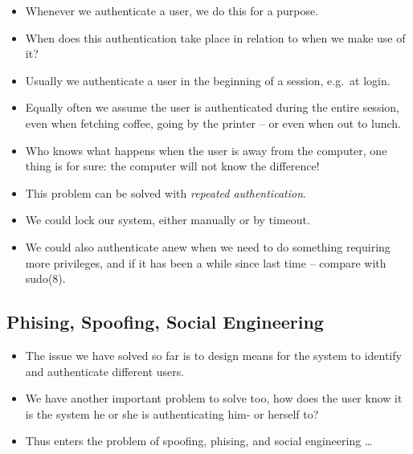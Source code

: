 \documentclass{beamer}
\begin{document}
\begin{frame}{\insertsubsectionhead}
  \begin{itemize}
    \item Whenever we authenticate a user, we do this for a purpose.

    \item When does this authentication take place in relation to when we make 
      use of it?

    \item Usually we authenticate a user in the beginning of a session, e.g.\ 
      at login.

    \item Equally often we assume the user is authenticated during the entire 
      session, even when fetching coffee, going by the printer -- or even when 
      out to lunch.

    \item Who knows what happens when the user is away from the computer, one 
      thing is for sure: the computer will not know the difference!

  \end{itemize}
\end{frame}

\begin{frame}{\insertsubsectionhead}
  \begin{itemize}
    \item This problem can be solved with \emph{repeated authentication}.

    \item We could lock our system, either manually or by timeout.

    \item We could also authenticate anew when we need to do something 
      requiring more privileges, and if it has been a while since last time -- 
      compare with sudo(8).
  \end{itemize}
\end{frame}

\subsection{Phising, Spoofing, Social Engineering}

\begin{frame}{\insertsubsectionhead}
  \begin{itemize}
    \item The issue we have solved so far is to design means for the system to 
      identify and authenticate different users.

    \item We have another important problem to solve too, how does the user 
      know it is the system he or she is authenticating him- or herself to?

    \item Thus enters the problem of spoofing, phising, and social engineering 
      \dots
  \end{itemize}
\end{frame}
\end{document}
